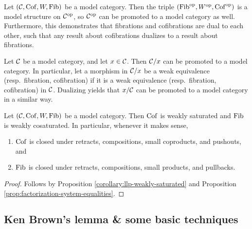 \begin{construction}[Opposites]
	Let \((\mathcal{C}, \operatorname{Cof}, W, \operatorname{Fib})\) be a model category. Then the triple \((\operatorname{Fib}^{\mathrm{op}}, W^{\mathrm{op}}, \operatorname{Cof}^{\mathrm{op}})\) is a model structure on \(\mathcal{C}^{\mathrm{op}}\), so \(\mathcal{C}^{\mathrm{op}}\) can be promoted to a model category
	as well. Furthermore, this demonstrates that fibrations and cofibrations are dual to each other, such that any result about cofibrations dualizes to a result about fibrations.
\end{construction}
\begin{construction}[Slices]
	Let \(\mathcal{C}\) be a model category, and let \(x\in\mathcal{C}\). Then \(\mathcal{C}/x\) can be promoted to a model category. In particular, let a morphism in \(\mathcal{C}/x\) be a weak equivalence (resp.\ fibration, cofibration)
	if it is a weak equivalence (resp.\ fibration, cofibration) in \(\mathcal{C}\). Dualizing yields that \(x/\mathcal{C}\) can be promoted to a model category in a similar way.
\end{construction}

\begin{proposition}\label{prop:model-category-cof-saturated-fib-cosaturated}
	Let \((\mathcal{C},\operatorname{Cof},W,\operatorname{Fib})\) be a model category. Then \(\operatorname{Cof}\) is weakly saturated and \(\operatorname{Fib}\) is weakly cosaturated. In particular, whenever it makes sense,
	\begin{enumerate}[label=(\arabic*)]
		\item \(\operatorname{Cof}\) is closed under retracts, compositions, small coproducts, and pushouts, and
		\item \(\operatorname{Fib}\) is closed under retracts, compositions, small products, and pullbacks.
	\end{enumerate}
\end{proposition}
\begin{proof}
Follows by Proposition \ref{corollary:llp-weakly-saturated} and Proposition \ref{prop:factorization-system-equalities}.
\end{proof}

\subsection{Ken Brown's lemma \& some basic techniques}

